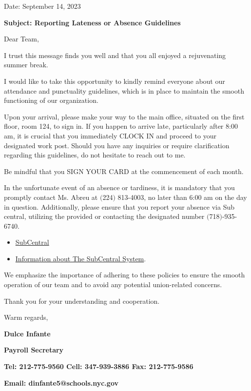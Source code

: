 \documentclass[11pt,letterpaper]{article}
\author{Hilduara Abreu}
\begin{document}
\vspace*{0.5in}
Date: September 14, 2023 

\textbf{Subject: Reporting Lateness or Absence Guidelines}

Dear Team,

I trust this message finds you well and that you all enjoyed a rejuvenating summer break.

I would like to take this opportunity to kindly remind everyone about our attendance and punctuality guidelines, which is in place to maintain the smooth functioning of our organization.

Upon your arrival, please make your way to the main office, situated on the first floor, room 124, to sign in. If you happen to arrive late, particularly after 8:00 am, it is crucial that you immediately CLOCK IN and proceed to your designated work post. Should you have any inquiries or require clarification 
regarding this guidelines, do not hesitate to reach out to me. 

Be mindful that you SIGN YOUR CARD at the commencement of each month.

In the unfortunate event of an absence or tardiness, it is mandatory that you promptly contact Ms. Abreu at $($224$)$ 813-4003, no later than 6:00 am on the day in question. Additionally, please ensure that you report your absence via Sub central, utilizing the provided or contacting the designated number $($718$)$-935-6740. 
\begin{itemize}
\item \href{https://subcentral.eschoolsolutions.com/logOnInitAction.do}{SubCentral}
\item \href {https://video.eschoolsolutions.com/udocs/NYCEmployeesWEBCAST2.0.pdf}{
Information about The SubCentral System}.
\end{itemize}
We emphasize the importance of adhering to these policies to ensure the smooth operation of our team and to avoid any potential union-related concerns.

Thank you for your understanding and cooperation.

Warm regards,

\begin{small}
\textbf{Dulce Infante}

\textbf{Payroll Secretary}

\textbf{Tel: 212-775-9560 Cell: 347-939-3886 Fax: 212-775-9586}

\textbf{Email: dinfante5@schools.nyc.gov}
\end{small}
\end{document}
